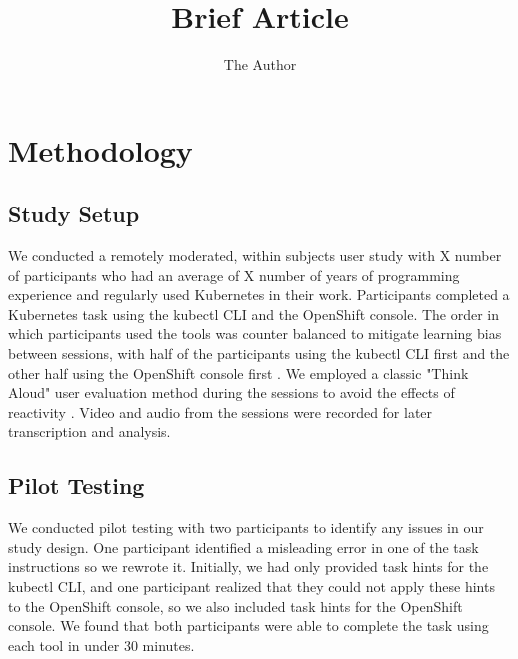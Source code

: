 \documentclass[11pt, oneside]{article}   	%
\title{Brief Article}
\author{The Author}
\begin{document}
\maketitle

\section{Methodology}
\subsection{Study Setup}
We conducted a remotely moderated, within subjects user study with X number of participants who had an average of X number of years of programming experience and regularly used Kubernetes in their work. Participants completed a Kubernetes task using the kubectl CLI and the OpenShift console. The order in which participants used the tools was counter balanced to mitigate learning bias between sessions, with half of the participants using the kubectl CLI first and the other half using the OpenShift console first \cite{}. We employed a classic "Think Aloud" user evaluation method during the sessions to avoid the effects of reactivity \cite{}. Video and audio from the sessions were recorded for later transcription and analysis.

\subsection{Pilot Testing}
We conducted pilot testing with two participants to identify any issues in our study design. One participant identified a misleading error in one of the task instructions so we rewrote it. Initially, we had only provided task hints for the kubectl CLI, and one participant realized that they could not apply these hints to the OpenShift console, so we also included task hints for the OpenShift console. We found that both participants were able to complete the task using each tool in under 30 minutes.
\end{document}
